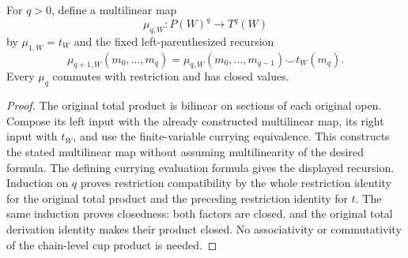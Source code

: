 \begin{definition}
\label{def:di-higher-exterior-ordered-powers}
\leanok
{}
For $q>0$, define a multilinear map
\[
 \mu_{q,W}:P(W)^q\longrightarrow T^q(W)
\]
by $\mu_{1,W}=t_W$ and the fixed left-parenthesized recursion
\[
 \mu_{q+1,W}(m_0,\ldots,m_q)
 =\mu_{q,W}(m_0,\ldots,m_{q-1})\smile t_W(m_q).
\]
Every $\mu_q$ commutes with restriction and has closed values.
\end{definition}
\begin{proof}
\leanok
The original total product is bilinear on sections of each original open.
Compose its left input with the already constructed multilinear map,
its right input with $t_W$, and use the finite-variable currying
equivalence. This constructs the stated multilinear map without assuming
multilinearity of the desired formula. The defining currying evaluation
formula gives the displayed recursion. Induction on $q$ proves restriction
compatibility by the whole restriction identity for the original total
product and the preceding restriction identity for $t$. The same induction
proves closedness: both factors are closed, and the original total
derivation identity makes their product closed. No associativity or
commutativity of the chain-level cup product is needed.
\end{proof}

